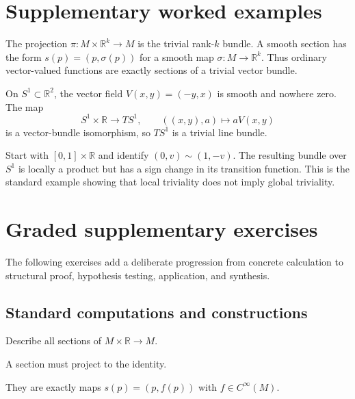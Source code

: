 \section{Supplementary worked examples}
\label{sec:vii07-pedagogy}

\begin{example}\label{ex:vii07-ped-01}
The projection \(\pi:M\times\mathbb R^k\to M\) is the trivial rank-\(k\) bundle.  A smooth section has the form \(s(p)=(p,\sigma(p))\) for a smooth map \(\sigma:M\to\mathbb R^k\).  Thus ordinary vector-valued functions are exactly sections of a trivial vector bundle.
\end{example}

\begin{example}\label{ex:vii07-ped-02}
On \(S^1\subset\mathbb R^2\), the vector field \(V(x,y)=(-y,x)\) is smooth and nowhere zero.  The map
\[
S^1\times\mathbb R\longrightarrow TS^1,\qquad ((x,y),a)\longmapsto aV(x,y)
\]
is a vector-bundle isomorphism, so \(TS^1\) is a trivial line bundle.
\end{example}

\begin{example}\label{ex:vii07-ped-03}
Start with \([0,1]\times\mathbb R\) and identify \((0,v)\sim(1,-v)\).  The resulting bundle over \(S^1\) is locally a product but has a sign change in its transition function.  This is the standard example showing that local triviality does not imply global triviality.
\end{example}

\section{Graded supplementary exercises}
The following exercises add a deliberate progression from concrete calculation to structural proof, hypothesis testing, application, and synthesis.

\subsection*{Standard computations and constructions}

\begin{exercise}\label{exr:vii07-ped-01}
Describe all sections of \(M\times\mathbb R\to M\).
\end{exercise}
\begin{hint}
A section must project to the identity.
\end{hint}
\begin{solution}
They are exactly maps \(s(p)=(p,f(p))\) with \(f\in C^\infty(M)\).
\end{solution}

